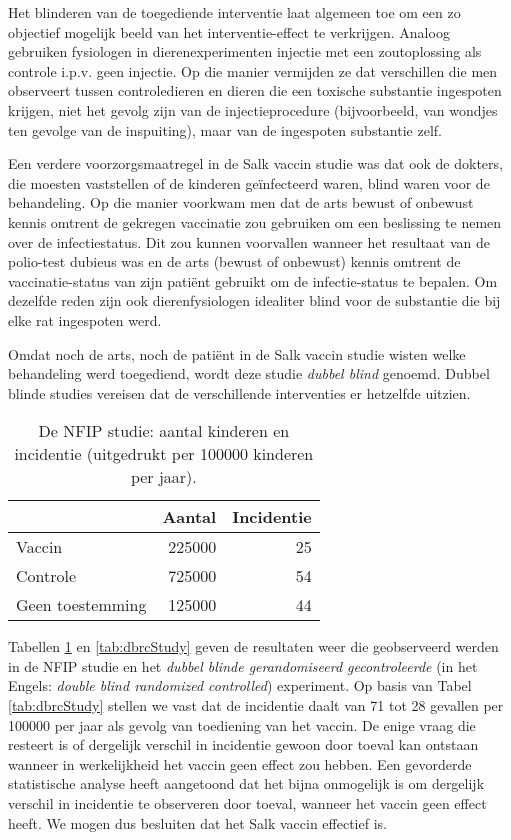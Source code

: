 \documentclass[
  12pt,dutch,coursenotes]{book}
\theoremstyle{definition}
\theoremstyle{definition}
\theoremstyle{definition}
\theoremstyle{remark}
\begin{document}
Het blinderen van de toegediende interventie laat algemeen toe om een zo objectief mogelijk
beeld van het interventie-effect te verkrijgen. Analoog gebruiken fysiologen in dierenexperimenten injectie met een zoutoplossing als controle i.p.v. geen injectie. Op die manier vermijden ze dat verschillen die men observeert tussen controledieren en dieren die een toxische substantie ingespoten krijgen, niet het gevolg zijn van de injectieprocedure (bijvoorbeeld, van wondjes ten gevolge van de inspuiting), maar van de ingespoten substantie zelf.

Een verdere voorzorgsmaatregel in de Salk vaccin studie was dat ook de
dokters, die moesten vaststellen of de kinderen geïnfecteerd waren,
blind waren voor de behandeling. Op die manier voorkwam men dat de arts
bewust of onbewust kennis omtrent de gekregen vaccinatie zou gebruiken om
een beslissing te nemen over de infectiestatus. Dit zou kunnen voorvallen
wanneer het resultaat van de polio-test dubieus was en de arts (bewust of
onbewust) kennis omtrent de vaccinatie-status van zijn patiënt gebruikt om
de infectie-status te bepalen. Om dezelfde reden zijn ook dierenfysiologen idealiter blind voor de substantie die bij elke rat ingespoten werd.

Omdat noch de arts, noch de patiënt in de Salk vaccin studie wisten welke
behandeling werd toegediend, wordt deze studie \emph{dubbel blind}
genoemd. Dubbel blinde studies vereisen dat de verschillende interventies er
hetzelfde uitzien.

\begin{table}[t]

\caption{\label{tab:nfipStudy}De NFIP studie: aantal kinderen en incidentie (uitgedrukt per
100000 kinderen per jaar).}
\centering
\begin{tabular}{lrr}
\toprule
  & Aantal & Incidentie\\
\midrule
Vaccin & 225000 & 25\\
Controle & 725000 & 54\\
Geen toestemming & 125000 & 44\\
\bottomrule
\end{tabular}
\end{table}

Tabellen \ref{tab:nfipStudy} en \ref{tab:dbrcStudy} geven de resultaten weer die geobserveerd
werden in de NFIP studie en het \emph{dubbel blinde gerandomiseerd
gecontroleerde} (in het Engels: \emph{double blind randomized controlled})
experiment. Op basis van Tabel \ref{tab:dbrcStudy} stellen we vast dat de incidentie
daalt van 71 tot 28 gevallen per 100000 per jaar als gevolg van
toediening van het vaccin. De enige vraag die resteert is of dergelijk
verschil in incidentie gewoon door toeval kan ontstaan wanneer in
werkelijkheid het vaccin geen effect zou hebben. Een gevorderde statistische analyse heeft aangetoond dat het bijna onmogelijk is om dergelijk verschil in incidentie
te observeren door toeval, wanneer het vaccin geen effect heeft. We mogen
dus besluiten dat het Salk vaccin effectief is.
\end{document}
